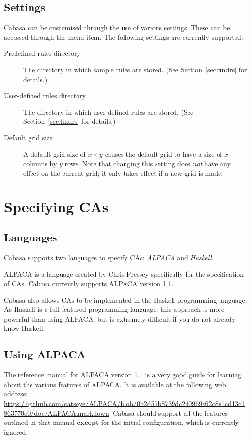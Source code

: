\documentclass[oneside,a4paper]{memoir}
\begin{document}
\section{Settings}
\label{sec:sets}

Cabasa can be customised through the use of various settings.
These can be accessed through the  menu item.
The following settings are currently supported:

\begin{description}
\item[Predefined rules directory]
  The directory in which sample rules are stored.
  (See Section~\ref{sec:findrs} for details.)
\item[User-defined rules directory]
  The directory in which user-defined rules are stored.
  (See Section~\ref{sec:findrs} for details.)
\item[Default grid size]
  A default grid size of $x \times y$ causes the default grid to have a size of $x$ columns by $y$ rows.
  Note that changing this setting does \textit{not} have any effect on the current grid;
    it only takes effect if a new grid is made.
\end{description}

\chapter{Specifying CAs}
\label{chap:speccas}

\section{Languages}
\label{sec:speclangs}

Cabasa supports two languages to specify CAs: \emph{ALPACA} and \emph{Haskell}.

ALPACA is a language created by Chris Pressey specifically for the specification of CAs.
Cabasa currently supports ALPACA version 1.1.

Cabasa also allows CAs to be implemented in the Haskell programming language.
As Haskell is a full-featured programming language, this approach is more powerful than using ALPACA,
  but is extremely difficult if you do not already know Haskell.

\section{Using ALPACA}
\label{sec:usalp}

The reference manual for ALPACA version 1.1 is a very good guide for learning about the various features of ALPACA.
It is available at the following web address: \url{https://github.com/catseye/ALPACA/blob/0b2d57b8739dc240969c62c8e1cd13c1863770e0/doc/ALPACA.markdown}.
Cabasa should support all the features outlined in that manual
  \textbf{except} for the initial configuration, which is currently ignored.
\end{document}
